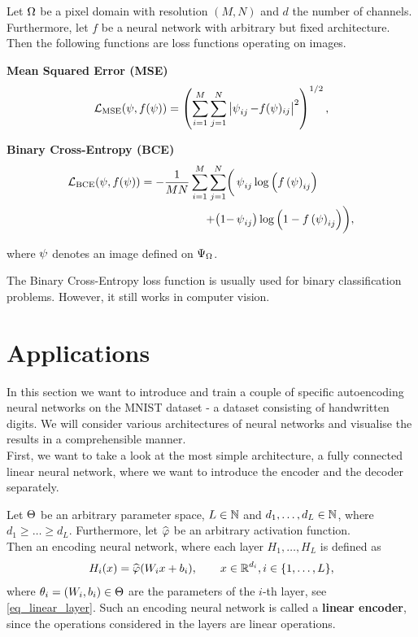 \begin{example}
Let $\Omega$ be a pixel domain with resolution $(M,N)$ and $d$ the number of channels. Furthermore, let $f$ be a neural network with arbitrary but fixed architecture. Then the following functions are loss functions operating on images.
\begin{mydescription}{}
\item[\textbf{Mean Squared Error (MSE)}] \begin{align*}
\operatorname{\operatorname{\mathcal{L}}_\text{MSE}}(\operatorname{\psi}, f(\operatorname{\psi})) = \left(\sum_{i=1}^{M}\sum_{j=1}^{N}\left|\operatorname{\psi}_{ij} - f(\operatorname{\psi})_{ij}\right|^2\right)^{1/2},
\end{align*}
\item[\textbf{Binary Cross-Entropy (BCE)}]
\begin{align*}
\operatorname{\operatorname{\mathcal{L}}_\text{BCE}}(\operatorname{\psi}, f(\operatorname{\psi})) = - \frac{1}{MN}\sum_{i=1}^{M}\sum_{j=1}^{N} \biggl(&\operatorname{\psi}_{ij} \log\left(f\left(\operatorname{\psi}\right)_{ij}\right)\\ + \bigl(1-&\operatorname{\psi}_{ij}\bigr)\log\left(1 - f\left(\operatorname{\psi}\right)_{ij}\right)\biggr),
\end{align*}
\end{mydescription}
where $\operatorname{\psi}$ denotes an image defined on $\Psi_{\Omega}$.
\end{example}


\begin{remark}
The Binary Cross-Entropy loss function is usually used for binary classification problems. However, it still works in computer vision.
\end{remark}


\section{Applications}

In this section we want to introduce and train a couple of specific autoencoding neural networks on the MNIST dataset - a dataset consisting of handwritten digits. We will consider various architectures of neural networks and visualise the results in a comprehensible manner.\\
First, we want to take a look at the most simple architecture, a fully connected linear neural network, where we want to introduce the encoder and the decoder separately.

\begin{definition}\label{def:linear_encoder}
Let $\operatorname{\Theta}$ be an arbitrary parameter space, $L\in \operatorname{\mathbb{N}}$ and $d_1,\ldots,d_L \in \operatorname{\mathbb{N}}$, where $d_1\geq \ldots \geq d_L$. Furthermore, let $\widehat{\operatorname{\varphi}}$ be an arbitrary activation function.\\
Then an encoding neural network, where each layer $H_1,\ldots, H_L$ is defined as
\begin{align*}
H_i(x) = \widehat{\operatorname{\varphi}}(W_ix + b_i), \qquad x \in \operatorname{\mathbb{R}}^{d_i}, i \in \{1,\ldots, L\},
\end{align*}
where $\theta_i = (W_i, b_i)\in\operatorname{\Theta}$ are the parameters of the $i$-th layer, see \eqref{eq_linear_layer}. Such an encoding neural network is called a \textbf{linear encoder}, since the operations considered in the layers are linear operations.
\end{definition}

